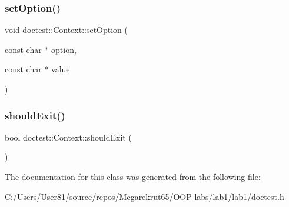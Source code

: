 \subsubsection{\texorpdfstring{set\+Option()}{setOption()}\hspace{0.1cm}{\footnotesize\ttfamily [2/2]}}
{\footnotesize\ttfamily void doctest\+::\+Context\+::set\+Option (\begin{DoxyParamCaption}\item[{const char $\ast$}]{option,  }\item[{const char $\ast$}]{value }\end{DoxyParamCaption})}

\mbox{\label{classdoctest_1_1_context_a219b10301380b81c84c0824a6876d9aa}} 
\subsubsection{\texorpdfstring{should\+Exit()}{shouldExit()}}
{\footnotesize\ttfamily bool doctest\+::\+Context\+::should\+Exit (\begin{DoxyParamCaption}{ }\end{DoxyParamCaption})}



The documentation for this class was generated from the following file\+:\begin{DoxyCompactItemize}
\item 
C\+:/\+Users/\+User81/source/repos/\+Megarekrut65/\+O\+O\+P-\/labs/lab1/lab1/\mbox{\hyperlink{doctest_8h}{doctest.\+h}}\end{DoxyCompactItemize}
